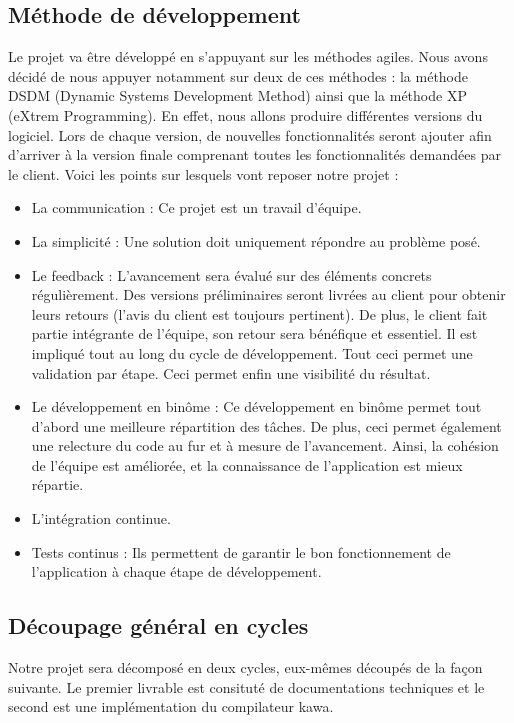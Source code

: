 \documentclass{../res/univ-projet}
\begin{document}
  \subsection{Méthode de développement}
    Le projet va être développé en s’appuyant sur les méthodes agiles. Nous avons décidé de nous appuyer notamment sur deux de ces méthodes : la méthode DSDM (Dynamic Systems Development Method) ainsi que la méthode XP (eXtrem Programming). En effet, nous allons produire différentes versions du logiciel. Lors de chaque version, de nouvelles fonctionnalités seront ajouter afin d’arriver à la version finale comprenant toutes les fonctionnalités demandées par le client. Voici les points sur lesquels vont reposer notre projet :
    \begin{itemize}
      \item La communication : Ce projet est un travail d’équipe.
      \item La simplicité : Une solution doit uniquement répondre au problème posé.
      \item Le feedback : L’avancement sera évalué sur des éléments concrets régulièrement. Des versions préliminaires seront livrées au client pour obtenir leurs retours (l’avis du client est toujours pertinent). De plus, le client fait partie intégrante de l’équipe, son retour sera bénéfique et essentiel. Il est impliqué tout au long du cycle de développement. Tout ceci permet une validation par étape. Ceci permet enfin une visibilité du résultat. 
      \item Le développement en binôme : Ce développement en binôme permet tout d’abord une meilleure répartition des tâches. De plus, ceci permet également une relecture du code au fur et à mesure de l’avancement. Ainsi, la cohésion de l’équipe est améliorée, et la connaissance de l’application est mieux répartie.
      \item L’intégration continue.
      \item Tests continus : Ils permettent de garantir le bon fonctionnement de l’application à chaque étape de développement.
    \end{itemize}
  \subsection{Découpage général en cycles}
    Notre projet sera décomposé en deux cycles, eux-mêmes découpés de la façon suivante. Le premier livrable est consituté de documentations techniques et le second est une implémentation du compilateur kawa.
\end{document}
